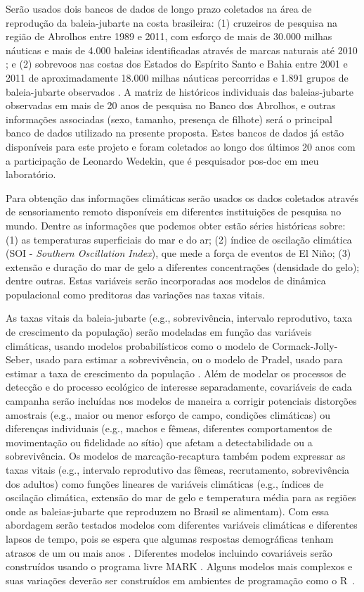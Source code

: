 \documentclass[12pt, A4]{article}
\newcommand{\R}{{\sf R}}
\begin{document}
Serão usados dois bancos de dados de longo prazo coletados na área de
reprodução da baleia-jubarte na costa brasileira: (1) cruzeiros de
pesquisa na região de Abrolhos entre 1989 e 2011, com esforço de mais de
30.000 milhas náuticas e mais de 4.000 baleias identificadas através
de marcas naturais até 2010 \citep{wedekin2010}; e (2) sobrevoos
nas costas dos Estados do Espírito Santo e Bahia entre 2001 e 2011
 de aproximadamente 18.000 milhas náuticas percorridas e 1.891 grupos de
baleia-jubarte observados \citep{andriolo2010}. A matriz de
históricos individuais das baleias-jubarte observadas em mais de 20
anos de pesquisa no Banco dos Abrolhos, e outras informações
associadas (sexo, tamanho, presença de filhote) será o principal banco
de dados utilizado na presente proposta. Estes bancos de dados já
estão disponíveis para este projeto e foram coletados ao longo dos
últimos 20 anos com a participação de Leonardo Wedekin, que é
pesquisador pos-doc em meu  laboratório.

Para obtenção das informações climáticas serão usados os dados
coletados através de sensoriamento remoto disponíveis em diferentes
instituições de pesquisa no mundo. Dentre as informações que podemos
obter estão séries históricas sobre: (1) as temperaturas superficiais
do mar e do ar; (2) índice de oscilação climática (SOI - \emph{Southern
Oscillation Index}), que mede a força de eventos de El Niño; (3)
extensão e duração do mar de gelo a diferentes concentrações
(densidade do gelo); dentre outras. Estas variáveis serão incorporadas
aos modelos de dinâmica populacional como preditoras das variações nas
taxas vitais.

As taxas vitais da baleia-jubarte (e.g., sobrevivência, intervalo
reprodutivo, taxa de crescimento da população) serão modeladas em
função das variáveis climáticas, usando modelos probabilísticos
como o modelo de Cormack-Jolly-Seber, usado para estimar a
sobrevivência, ou o modelo de Pradel, usado para estimar a taxa de
crescimento da população \citep{lebreton1992}. Além de modelar os
processos de detecção e do processo ecológico de interesse
separadamente, covariáveis de cada campanha serão incluídas nos
modelos de maneira a corrigir potenciais distorções amostrais (e.g.,
maior ou menor esforço de campo, condições climáticas) ou diferenças
individuais (e.g., machos e fêmeas, diferentes comportamentos de
movimentação ou fidelidade ao sítio) que afetam a detectabilidade ou a
sobrevivência. Os modelos de marcação-recaptura também podem expressar
as taxas vitais (e.g., intervalo reprodutivo das fêmeas, recrutamento,
sobrevivência dos adultos) como funções lineares de variáveis
climáticas (e.g., índices de oscilação climática, extensão do mar de
gelo e temperatura média para as regiões onde as baleias-jubarte que
reproduzem no Brasil se alimentam). Com essa abordagem serão testados
modelos com diferentes variáveis climáticas e diferentes lapsos de
tempo, pois se espera que algumas respostas demográficas tenham
atrasos de um ou mais anos \citep[e.g.][]{leaper2006}. Diferentes
modelos incluindo covariáveis serão construídos usando o programa
livre MARK \citep{White1999}. Alguns modelos mais complexos e
suas variações deverão ser construídos em ambientes de programação
como o \R \  \citep{R2012}.
\end{document}
